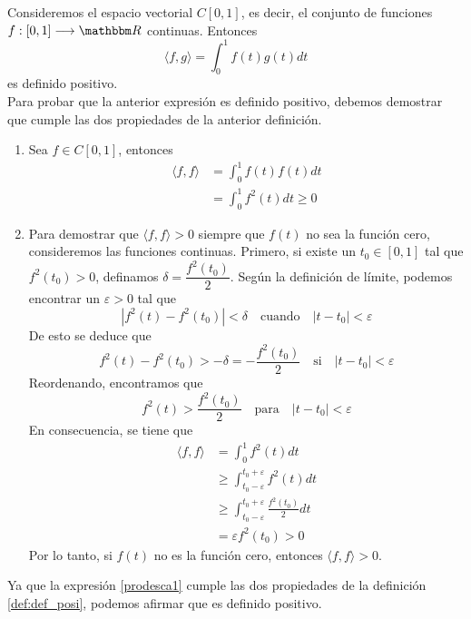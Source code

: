 \begin{example}
    Consideremos el espacio vectorial $C[0,  1]$, es decir, el conjunto de funciones $f:[0,  1] \longrightarrow \RR$ continuas. Entonces
    \begin{equation}
        \langle f, g \rangle = \int_0^1 f(t) g(t) dt \label{prodesca1}
    \end{equation}
    es definido positivo. \\
    \solucion Para probar que la anterior expresión es definido positivo, debemos demostrar que cumple las dos propiedades de la anterior definición.\newpage
    \begin{enumerate}[label=\roman*)]
        \item Sea $f \in C[0, 1]$, entonces
        \begin{align*}
            \langle f, f \rangle & = \int_0^1 f(t) f(t) dt \\
            & = \int_0^1 f^2(t) dt \geq 0
        \end{align*}
        \item Para demostrar que $\langle f, f \rangle > 0$ siempre que $f(t)$ no sea la función cero, consideremos las funciones continuas. Primero, si existe un $t_0 \in [0, 1]$ tal que $f^2(t_0) > 0$, definamos $\delta = \dfrac{f^2(t_0)}{2}$. Según la definición de límite, podemos encontrar un $\varepsilon > 0$ tal que
        $$\left| f^2(t) - f^2(t_0) \right| < \delta \quad \text{cuando} \quad |t - t_0| < \varepsilon$$
        De esto se deduce que
        $$f^2(t) - f^2(t_0) > -\delta = - \frac{f^2(t_0)}{2} \quad \text{si} \quad |t - t_0| < \varepsilon$$
        Reordenando, encontramos que
        $$f^2(t) > \frac{f^2(t_0)}{2} \quad \text{para} \quad |t - t_0| < \varepsilon$$
        En consecuencia, se tiene que
        \begin{align*}
            \langle f, f \rangle & = \int_0^1 f^2(t) dt \\
            & \geq \int_{t_0 - \varepsilon}^{t_0 + \varepsilon} f^2(t) dt \\
            & \geq \int_{t_0 - \varepsilon}^{t_0 + \varepsilon} \frac{f^2(t_0)}{2} dt \\
            & = \varepsilon f^2(t_0) > 0
        \end{align*}
        Por lo tanto, si $f(t)$ no es la función cero, entonces $\langle f, f \rangle > 0$.
    \end{enumerate}
    Ya que la expresión \eqref{prodesca1} cumple las dos propiedades de la definición \ref{def:def_posi}, podemos afirmar que es definido positivo.
\end{example}


